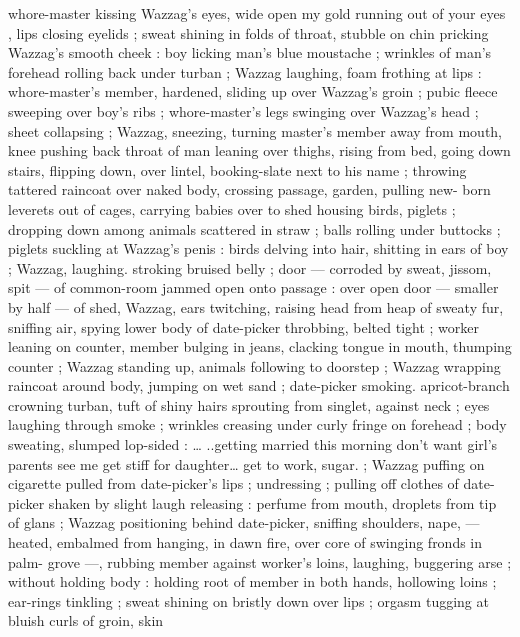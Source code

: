 whore-master kissing Wazzag's eyes, wide open{\td} {\gl} {\td} my gold 
running out of your eyes{\td} {\gr}, lips closing eyelids ; sweat shining in 
folds of throat, stubble on chin pricking Wazzag's smooth cheek : 
boy licking man's blue moustache ; wrinkles of man's forehead 
rolling back under turban ; Wazzag laughing, foam frothing at lips : 
whore-master's member, hardened, sliding up over Wazzag's groin ; 
pubic fleece sweeping over boy's ribs ; whore-master's legs swinging 
over Wazzag's head ; sheet collapsing ; Wazzag, sneezing, turning 
master's member away from mouth, knee pushing back throat of man 
leaning over thighs, rising from bed, going down stairs, flipping 
down, over lintel, booking-slate next to his name ; throwing tattered 
raincoat over naked body, crossing passage, garden, pulling new- 
born leverets out of cages, carrying babies over to shed housing 
birds, piglets ; dropping down among animals scattered in straw ; 
balls rolling under buttocks ; piglets suckling at Wazzag's penis : 
birds delving into hair, shitting in ears of boy ; Wazzag, laughing. 
stroking bruised belly ; door --- corroded by sweat, jissom, spit --- 
of common-room jammed open onto passage : over open door --- 
smaller by half --- of shed, Wazzag, ears twitching, raising head from 
heap of sweaty fur, sniffing air, spying lower body of date-picker 
throbbing, belted tight ; worker leaning on counter, member bulging 
in jeans, clacking tongue in mouth, thumping counter ; Wazzag 
standing up, animals following to doorstep ; Wazzag wrapping 
raincoat around body, jumping on wet sand ; date-picker smoking. 
apricot-branch crowning turban, tuft of shiny hairs sprouting from 
singlet, against neck ; eyes laughing through smoke ; wrinkles 
creasing under curly fringe on forehead ; body sweating, slumped 
lop-sided : {\ldots}{\gl} ..getting married this morning{\td} don't want girl's 
parents see me get stiff for daughter{\ldots} get to work, sugar.{\gr} ; Wazzag 
puffing on cigarette pulled from date-picker's lips ; undressing ; 
pulling off clothes of date-picker shaken by slight laugh releasing : 
perfume from mouth, droplets from tip of glans ; Wazzag positioning 
behind date-picker, sniffing shoulders, nape, --- heated, embalmed 
from hanging, in dawn fire, over core of swinging fronds in palm- 
grove ---, rubbing member against worker's loins, laughing, 
buggering arse ; without holding body : holding root of member in 
both hands, hollowing loins ; ear-rings tinkling ; sweat shining on 
bristly down over lips ; orgasm tugging at bluish curls of groin, skin 
